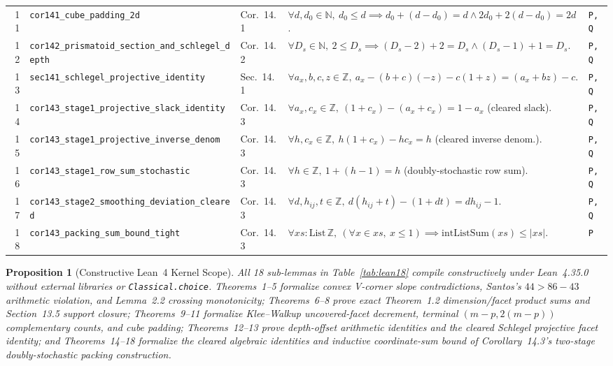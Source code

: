 \documentclass[10pt,twocolumn]{article}
\newtheorem{proposition}{Proposition}
\newcommand{\ZZ}{\mathbb{Z}}
\newcommand{\NN}{\mathbb{N}}
\begin{document}
\begin{table}[t]
\begin{tabular}{@{}r l l p{9.6cm} l@{}}
11 & \texttt{cor141\_cube\_padding\_2d} & Cor.~14.1 & $\forall d,d_0\in\NN,\ d_0\le d \implies d_0+(d-d_0)=d \wedge 2d_0+2(d-d_0)=2d$. & \texttt{P,Q} \\
12 & \texttt{cor142\_prismatoid\_section\_and\_schlegel\_depth} & Cor.~14.2 & $\forall D_s\in\NN,\ 2\le D_s \implies (D_s-2)+2=D_s \wedge (D_s-1)+1=D_s$. & \texttt{P,Q} \\
13 & \texttt{sec141\_schlegel\_projective\_identity} & Sec.~14.1 & $\forall a_x,b,c,z\in\ZZ,\ a_x-(b+c)(-z)-c(1+z)=(a_x+bz)-c$. & \texttt{P,Q} \\
14 & \texttt{cor143\_stage1\_projective\_slack\_identity} & Cor.~14.3 & $\forall a_x,c_x\in\ZZ,\ (1+c_x)-(a_x+c_x)=1-a_x$ (cleared slack). & \texttt{P,Q} \\
15 & \texttt{cor143\_stage1\_projective\_inverse\_denom} & Cor.~14.3 & $\forall h,c_x\in\ZZ,\ h(1+c_x)-hc_x=h$ (cleared inverse denom.). & \texttt{P,Q} \\
16 & \texttt{cor143\_stage1\_row\_sum\_stochastic} & Cor.~14.3 & $\forall h\in\ZZ,\ 1+(h-1)=h$ (doubly-stochastic row sum). & \texttt{P,Q} \\
17 & \texttt{cor143\_stage2\_smoothing\_deviation\_cleared} & Cor.~14.3 & $\forall d,h_{ij},t\in\ZZ,\ d(h_{ij}+t)-(1+dt)=dh_{ij}-1$. & \texttt{P,Q} \\
18 & \texttt{cor143\_packing\_sum\_bound\_tight} & Cor.~14.3 & $\forall xs:\mathrm{List}\,\ZZ,\ (\forall x\in xs,\ x\le 1) \implies \mathrm{intListSum}(xs)\le |xs|$. & \texttt{P} \\
\bottomrule
\end{tabular}
\end{table}

\begin{proposition}[Constructive Lean~4 Kernel Scope]\label{prop:lean}
\normalfont All 18 sub-lemmas in Table~\ref{tab:lean18} compile constructively under Lean~4.35.0 without external libraries or \texttt{Classical.choice}. Theorems~1--5 formalize convex V-corner slope contradictions, Santos's $44 > 86-43$ arithmetic violation, and Lemma~2.2 crossing monotonicity; Theorems~6--8 prove exact Theorem~1.2 dimension/facet product sums and Section~13.5 support closure; Theorems~9--11 formalize Klee--Walkup uncovered-facet decrement, terminal $(m-p,2(m-p))$ complementary counts, and cube padding; Theorems~12--13 prove depth-offset arithmetic identities and the cleared Schlegel projective facet identity; and Theorems~14--18 formalize the cleared algebraic identities and inductive coordinate-sum bound of Corollary~14.3's two-stage doubly-stochastic packing construction.
\end{proposition}
\end{document}
